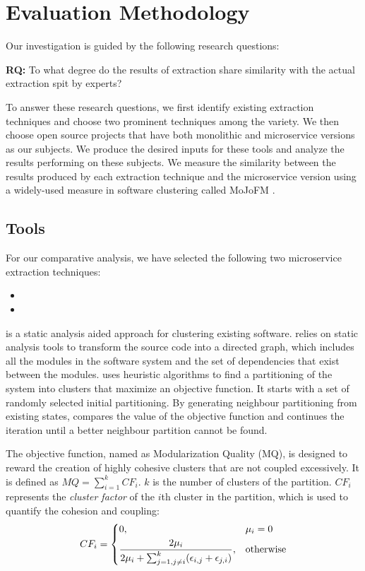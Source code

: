 \section{Evaluation Methodology}
\label{sec:eval}
Our investigation is guided by the following research questions:

\noindent 
{\bf RQ:} To what degree do the results of extraction share similarity with the actual extraction spit by experts?

To answer these research questions, we first identify existing extraction techniques and choose two prominent techniques among the variety. We then choose open source projects that have both monolithic and microservice versions as our subjects. We produce the desired inputs for these tools and analyze the results performing on these subjects. We measure the similarity between the results produced by each extraction technique and the microservice version using a widely-used measure in software clustering called MoJoFM \cite{Wen:Tzerpos:2004}.

\subsection{Tools}

For our comparative analysis, we have selected the following two microservice extraction techniques:
\begin{itemize}
    \item \fs
    \item \bn
\end{itemize}

\textbf{\bn} is a static analysis aided approach for clustering existing software. \bn relies on static analysis tools to transform the source code into a directed graph, which includes all the modules in the software system and the set of dependencies that exist between the modules. \bn uses heuristic algorithms to find a partitioning of the system into clusters that maximize an objective function. It starts with a set of randomly selected initial partitioning. By generating neighbour partitioning from existing states, \bn compares the value of the objective function and continues the iteration until a better neighbour partition cannot be found.

The objective function, named as Modularization Quality (MQ), is designed to reward the creation of highly cohesive clusters that are not coupled excessively. It is defined as $MQ = \sum_{i=1}^{k}CF_i$. $k$ is the number of clusters of the partition. $CF_i$ represents the \textit{cluster factor} of the $i$th cluster in the partition, which is used to quantify the cohesion and coupling:
\[
   CF_i= 
\begin{dcases}
    0,              & \mu_i = 0  \\
    \frac{2\mu_i}{2\mu_i + \sum_{j=1, j \neq i}^{k}(\epsilon_{i,j} + \epsilon_{j, i})},              & \text{otherwise}
\end{dcases}
\]

